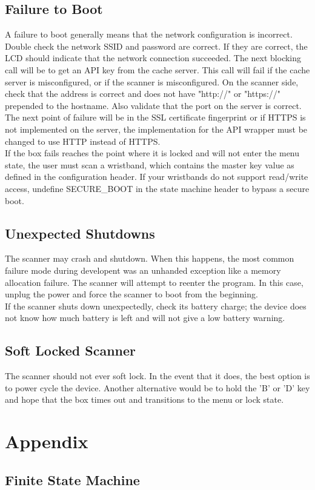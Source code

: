 \documentclass{article}
\begin{document}
\subsection{Failure to Boot}
A failure to boot generally means that the network configuration is incorrect.  Double check the network SSID and password are correct.  If they are correct, the LCD should indicate that the network connection succeeded.  The next blocking call will be to get an API key from the cache server.  This call will fail if the cache server is misconfigured, or if the scanner is misconfigured.  On the scanner side, check that the address is correct and does not have "http://" or "https://" prepended to the hostname.  Also validate that the port on the server is correct.  The next point of failure will be in the SSL certificate fingerprint or if HTTPS is not implemented on the server, the implementation for the API wrapper must be changed to use HTTP instead of HTTPS.  \\
If the box fails reaches the point where it is locked and will not enter the menu state, the user must scan a wristband, which contains the master key value as defined in the configuration header.  If your wristbands do not support read/write access, undefine SECURE\_BOOT in the state machine header to bypass a secure boot.  

\subsection{Unexpected Shutdowns}
The scanner may crash and shutdown.  When this happens, the most common failure mode during developent was an unhanded exception like a memory allocation failure.  The scanner will attempt to reenter the program.  In this case, unplug the power and force the scanner to boot from the beginning.  \\
If the scanner shuts down unexpectedly, check its battery charge; the device does not know how much battery is left and will not give a low battery warning.  

\subsection{Soft Locked Scanner}
The scanner should not ever soft lock.  In the event that it does, the best option is to power cycle the device.  Another alternative would be to hold the 'B' or 'D' key and hope that the box times out and transitions to the menu or lock state.

\section{Appendix}

\subsection{Finite State Machine}
\end{document}
